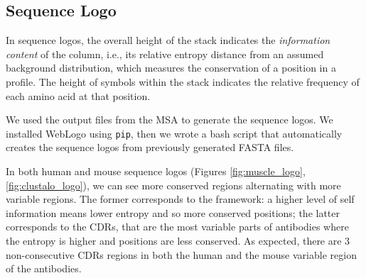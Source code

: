 \documentclass[11pt]{article}
\begin{document}
\subsection{Sequence Logo}

In sequence logos, the overall height of the stack indicates the \textit{information content} of the column, i.e., its relative entropy distance from an assumed background distribution, which measures the conservation of a position in a profile. %
The height of symbols within the stack indicates the relative frequency of each amino acid at that position.

We used the output files from the MSA to generate the sequence logos. We installed WebLogo using \verb|pip|, then we wrote a bash script that automatically creates the sequence logos from previously generated FASTA files. 

\indent In both human and mouse sequence logos (Figures \ref{fig:muscle_logo}, \ref{fig:clustalo_logo}), we can see more conserved regions alternating with more variable regions. The former corresponds to the framework: a higher level of self information means lower entropy and so more conserved positions; the latter corresponds to the CDRs, that are the most variable parts of antibodies where the entropy is higher and positions are less conserved. As expected, there are 3 non-consecutive CDRs regions in both the human and the mouse variable region of the antibodies. 
\end{document}
